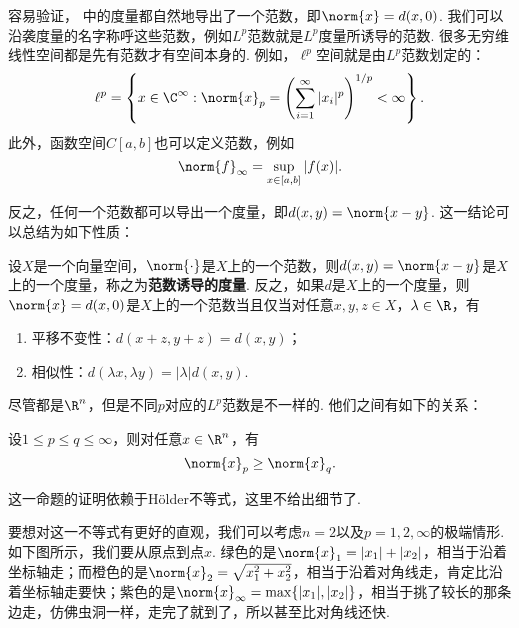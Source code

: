 容易验证， 中的度量都自然地导出了一个范数，即$\norm{x}=d(x,0)$. 我们可以沿袭度量的名字称呼这些范数，例如$L^p$范数就是$L^p$度量所诱导的范数. 很多无穷维线性空间都是先有范数才有空间本身的. 例如，$\ell^p$空间就是由$L^p$范数划定的：
\[ \ell^p=\left\{x\in\C^\infty:\norm{x}_p=\left(\sum_{i=1}^\infty|x_i|^p\right)^{1/p}<\infty\right\}. \]
此外，函数空间$C[a,b]$也可以定义范数，例如
\[ \norm{f}_\infty=\sup_{x\in[a,b]}|f(x)|. \]

反之，任何一个范数都可以导出一个度量，即$d(x,y)=\norm{x-y}$. 这一结论可以总结为如下性质：

\begin{theorem}\label{thm:metric-norm}
    设$X$是一个向量空间，$\norm{\cdot}$是$X$上的一个范数，则$d(x,y)=\norm{x-y}$是$X$上的一个度量，称之为\textbf{范数诱导的度量}. 反之，如果$d$是$X$上的一个度量，则$\norm{x}=d(x,0)$是$X$上的一个范数当且仅当对任意$x,y,z\in X$，$\lambda\in\R$，有
    \begin{enumerate}
        \item 平移不变性：$d(x+z,y+z)=d(x,y)$；
        \item 相似性：$d(\lambda x,\lambda y)=|\lambda|d(x,y)$.
    \end{enumerate}
\end{theorem}

尽管都是$\R^n$，但是不同$p$对应的$L^p$范数是不一样的. 他们之间有如下的关系：

\begin{proposition}\label{prop:lp-norm}
    设$1\leq p\leq q\leq \infty$，则对任意$x\in\R^n$，有
    \[\norm{x}_p\geq \norm{x}_q.\]
\end{proposition}

这一命题的证明依赖于H\"older不等式，这里不给出细节了. 

要想对这一不等式有更好的直观，我们可以考虑$n=2$以及$p=1,2,\infty$的极端情形. 如下图所示，我们要从原点到点$x$. 绿色的是$\norm{x}_1=|x_1|+|x_2|$，相当于沿着坐标轴走；而橙色的是$\norm{x}_2=\sqrt{x_1^2+x_2^2}$，相当于沿着对角线走，肯定比沿着坐标轴走要快；紫色的是$\norm{x}_\infty=\max\{|x_1|,|x_2|\}$，相当于挑了较长的那条边走，仿佛虫洞一样，走完了就到了，所以甚至比对角线还快. 

\begin{center}
\end{center}

